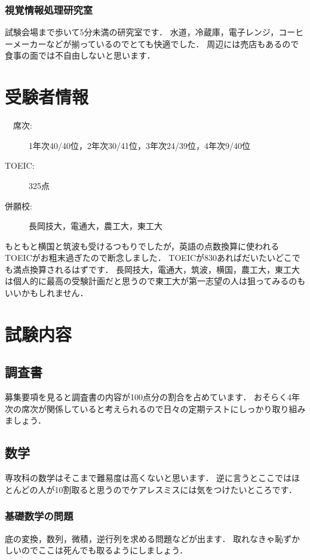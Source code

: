 \documentclass[dvipdfmx]{jsarticle}
\begin{document}
\subsubsection*{視覚情報処理研究室}
試験会場まで歩いて5分未満の研究室です．
水道，冷蔵庫，電子レンジ，コーヒーメーカーなどが揃っているのでとても快適でした．
周辺には売店もあるので食事の面では不自由しないと思います．

\section{受験者情報}
\begin{description}
  \item[ 　席次:] 1年次40/40位，2年次30/41位，3年次24/39位，4年次9/40位
  \item[TOEIC:] 325点
  \item[ 併願校:] 長岡技大，電通大，農工大，東工大
\end{description}
もともと横国と筑波も受けるつもりでしたが，英語の点数換算に使われるTOEICがお粗末過ぎたので断念しました．
TOEICが830あればだいたいどこでも満点換算されるはずです．
長岡技大，電通大，筑波，横国，農工大，東工大は個人的に最高の受験計画だと思うので東工大が第一志望の人は狙ってみるのもいいかもしれません．


\section{試験内容}
\subsection{調査書}
募集要項を見ると調査書の内容が100点分の割合を占めています．
おそらく4年次の席次が関係していると考えられるので日々の定期テストにしっかり取り組みましょう．


\subsection{数学}
専攻科の数学はそこまで難易度は高くないと思います．
逆に言うとここではほとんどの人が10割取ると思うのでケアレスミスには気をつけたいところです．

\subsubsection*{基礎数学の問題}
底の変換，数列，微積，逆行列を求める問題などが出ます．
取れなきゃ恥ずかしいのでここは死んでも取るようにしましょう．
\end{document}
